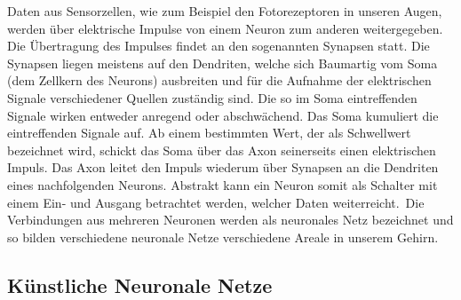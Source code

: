 Daten aus Sensorzellen, wie zum Beispiel den Fotorezeptoren in unseren Augen, werden über elektrische Impulse von einem Neuron zum anderen weitergegeben. Die Übertragung des Impulses findet an den sogenannten Synapsen statt. Die Synapsen liegen meistens auf den Dendriten, welche sich Baumartig vom Soma (dem Zellkern des Neurons) ausbreiten und für die Aufnahme der elektrischen Signale verschiedener Quellen zuständig sind. Die so im Soma eintreffenden Signale wirken entweder anregend oder abschwächend. Das Soma kumuliert die eintreffenden Signale auf. Ab einem bestimmten Wert, der als Schwellwert bezeichnet wird, schickt das Soma über das Axon seinerseits einen elektrischen Impuls. Das Axon leitet den Impuls wiederum über Synapsen an die Dendriten eines nachfolgenden Neurons. Abstrakt kann ein Neuron somit als Schalter mit einem Ein- und Ausgang betrachtet werden, welcher Daten weiterreicht.\, Die Verbindungen aus mehreren Neuronen werden als neuronales Netz bezeichnet und so bilden verschiedene neuronale Netze verschiedene Areale in unserem Gehirn. 


\subsection{Künstliche Neuronale Netze}\label{sec:einf_neuro}






